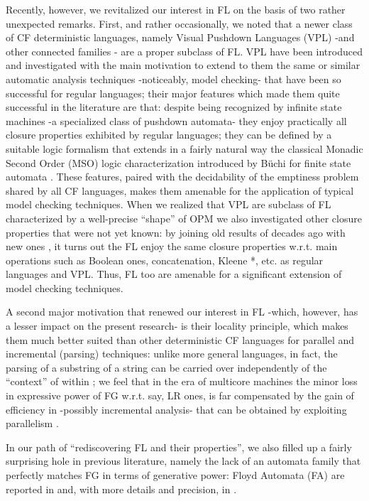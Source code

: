 \documentclass[10pt,a4paper,runningheads]{llncs}
\begin{document}
Recently, however, we revitalized our interest in FL on the basis of
two rather unexpected remarks.  First, and rather occasionally, we
noted that a newer class of CF deterministic languages, namely Visual
Pushdown Languages (VPL) -and other connected families
\cite{Berstel:2001:BGT,conf/mfcs/NowotkaS07,caucal:DSP:2008:1743}- are
a proper subclass of FL. VPL have been introduced and investigated
\cite{AluMad04} with the main motivation to extend to them the same or
similar automatic analysis techniques -noticeably, model checking-
that have been so successful for regular languages; their major
features which made them quite successful in the literature are that:
despite being recognized by infinite state machines -a specialized
class of pushdown automata- they enjoy practically all closure
properties exhibited by regular languages; they can be defined by a
suitable logic formalism that extends in a fairly natural way the
classical Monadic Second Order (MSO) logic characterization introduced
by B\"uchi for finite state automata \cite{thomas90}.  These features,
paired with the decidability of the emptiness problem shared by all CF
languages, makes them amenable for the application of typical model
checking techniques.  When we realized that VPL are subclass of FL
characterized by a well-precise ``shape'' of OPM we also investigated
other closure properties that were not yet known: by joining old
results of decades ago \cite{Crespi-ReghizziMM1978} with new ones
\cite{Crespi-ReghizziM12}, it turns out the FL enjoy the same closure
properties w.r.t. main operations such as Boolean ones, concatenation,
Kleene *, etc. as regular languages and VPL. Thus, FL too are amenable
for a significant extension of model checking techniques.
 
A second major motivation that renewed our interest in FL -which,
however, has a lesser impact on the present research- is their
locality principle, which makes them much better suited than other
deterministic CF languages for parallel and incremental (parsing)
techniques: unlike more general languages, in fact, the parsing of a
substring  of a string  can be carried over independently of the
``context'' of  within ; we feel that in the era of multicore
machines the minor loss in expressive power of FG w.r.t. say, LR ones,
is far compensated by the gain of efficiency in -possibly incremental
analysis- that can be obtained by exploiting parallelism
\cite{BCMPPV12}.

In our path of ``rediscovering FL and their properties'', we also
filled up a fairly surprising hole in previous literature, namely the
lack of an automata family that perfectly matches FG in terms of
generative power: Floyd Automata (FA) are reported in \cite{LMP11}
and, with more details and precision, in \cite{LMP10}.
\end{document}
